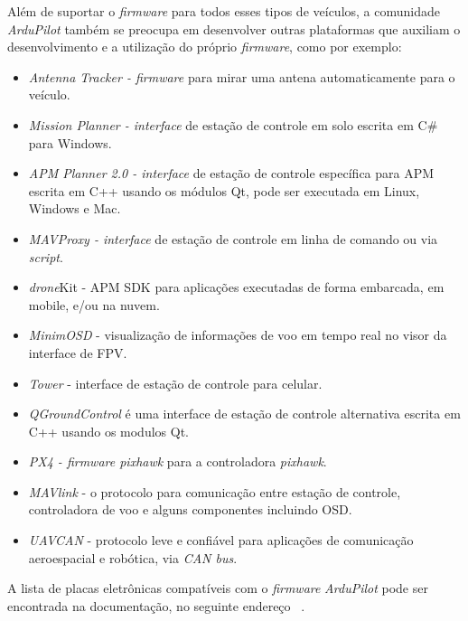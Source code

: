 \documentclass[12pt,a4paper,oneside]{book}
\begin{document}
Além de suportar o \textit{firmware} para todos esses tipos de veículos, a comunidade \textit{ArduPilot} também se preocupa em desenvolver outras plataformas que auxiliam o desenvolvimento e a utilização do próprio \textit{firmware}, como por exemplo:

\begin{itemize}
  \item \textit{Antenna Tracker - firmware} para mirar uma antena automaticamente para o veículo.

  \item \textit{Mission Planner - interface} de estação de controle em solo escrita em C\# para Windows.
  
  \item \textit{APM Planner 2.0 - interface} de estação de controle específica para APM escrita em C++ usando os módulos Qt, pode ser executada em Linux, Windows e Mac.
  
  \item \textit{MAVProxy - interface} de estação de controle em linha de comando ou via \textit{script}.
  
  \item \textit{drone}Kit - APM SDK para aplicações executadas de forma embarcada, em mobile, e/ou na nuvem.
  
  \item \textit{MinimOSD} - visualização de informações de voo em tempo real no visor da interface de FPV.
  \item \textit{Tower} - interface de estação de controle para celular.  
  \item \textit{QGroundControl} é uma interface de estação de controle alternativa escrita em C++ usando os modulos Qt.
  \item \textit{PX4 - firmware pixhawk} para a controladora \textit{pixhawk}.
  
  \item \textit{MAVlink} - o protocolo para comunicação entre estação de controle, controladora de voo e alguns componentes incluindo OSD.
  
  \item \textit{UAVCAN} - protocolo leve e confiável para aplicações de comunicação aeroespacial e robótica, via \textit{CAN bus}. 
  
\end{itemize}

A lista de placas eletrônicas compatíveis com o \textit{firmware} \textit{ArduPilot} pode ser encontrada na documentação, no seguinte endereço ~\cite{url:ardupilotdoc}. 
\end{document}
